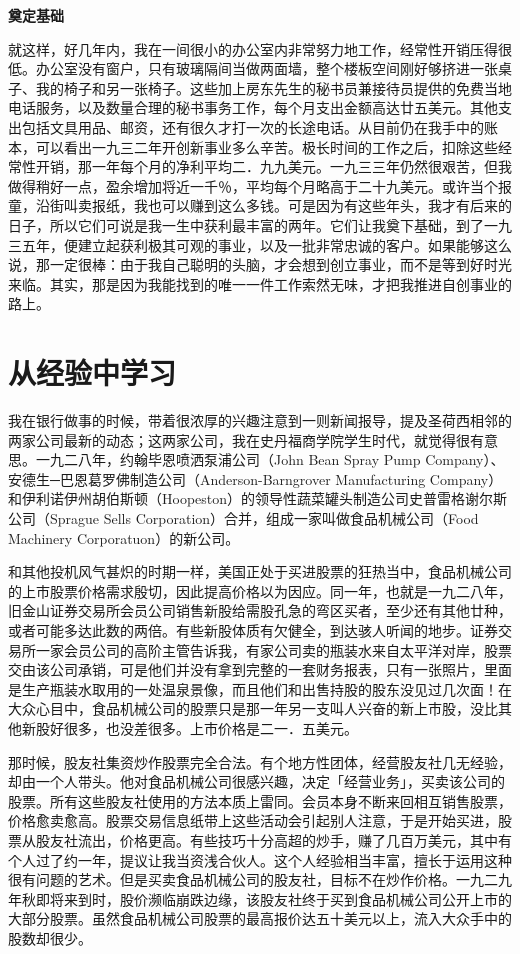 \documentclass[UTF8,a4paper,zihao=-4,fontset = windows]{ctexart} %
\begin{document}
\textbf{奠定基础}


就这样，好几年内，我在一间很小的办公室内非常努力地工作，经常性开销压得很低。办公室没有窗户，只有玻璃隔间当做两面墙，整个楼板空间刚好够挤进一张桌子、我的椅子和另一张椅子。这些加上房东先生的秘书员兼接待员提供的免费当地电话服务，以及数量合理的秘书事务工作，每个月支出金额高达廿五美元。其他支出包括文具用品、邮资，还有很久才打一次的长途电话。从目前仍在我手中的账本，可以看出一九三二年开创新事业多么辛苦。极长时间的工作之后，扣除这些经常性开销，那一年每个月的净利平均二．九九美元。一九三三年仍然很艰苦，但我做得稍好一点，盈余增加将近一千％，平均每个月略高于二十九美元。或许当个报童，沿街叫卖报纸，我也可以赚到这么多钱。可是因为有这些年头，我才有后来的日子，所以它们可说是我一生中获利最丰富的两年。它们让我奠下基础，到了一九三五年，便建立起获利极其可观的事业，以及一批非常忠诚的客户。如果能够这么说，那一定很棒：由于我自己聪明的头脑，才会想到创立事业，而不是等到好时光来临。其实，那是因为我能找到的唯一一件工作索然无味，才把我推进自创事业的路上。

\section{从经验中学习}

我在银行做事的时候，带着很浓厚的兴趣注意到一则新闻报导，提及圣荷西相邻的两家公司最新的动态；这两家公司，我在史丹福商学院学生时代，就觉得很有意思。一九二八年，约翰毕恩喷洒泵浦公司（John Bean Spray Pump Company）、安德生─巴恩葛罗佛制造公司（Anderson-Barngrover Manufacturing Company）和伊利诺伊州胡伯斯顿（Hoopeston）的领导性蔬菜罐头制造公司史普雷格谢尔斯公司（Sprague Sells Corporation）合并，组成一家叫做食品机械公司（Food Machinery Corporatuon）的新公司。

和其他投机风气甚炽的时期一样，美国正处于买进股票的狂热当中，食品机械公司的上市股票价格需求殷切，因此提高价格以为因应。同一年，也就是一九二八年，旧金山证券交易所会员公司销售新股给需股孔急的弯区买者，至少还有其他廿种，或者可能多达此数的两倍。有些新股体质有欠健全，到达骇人听闻的地步。证券交易所一家会员公司的高阶主管告诉我，有家公司卖的瓶装水来自太平洋对岸，股票交由该公司承销，可是他们并没有拿到完整的一套财务报表，只有一张照片，里面是生产瓶装水取用的一处温泉景像，而且他们和出售持股的股东没见过几次面！在大众心目中，食品机械公司的股票只是那一年另一支叫人兴奋的新上市股，没比其他新股好很多，也没差很多。上市价格是二一．五美元。

那时候，股友社集资炒作股票完全合法。有个地方性团体，经营股友社几无经验，却由一个人带头。他对食品机械公司很感兴趣，决定「经营业务」，买卖该公司的股票。所有这些股友社使用的方法本质上雷同。会员本身不断来回相互销售股票，价格愈卖愈高。股票交易信息纸带上这些活动会引起别人注意，于是开始买进，股票从股友社流出，价格更高。有些技巧十分高超的炒手，赚了几百万美元，其中有个人过了约一年，提议让我当资浅合伙人。这个人经验相当丰富，擅长于运用这种很有问题的艺术。但是买卖食品机械公司的股友社，目标不在炒作价格。一九二九年秋即将来到时，股价濒临崩跌边缘，该股友社终于买到食品机械公司公开上市的大部分股票。虽然食品机械公司股票的最高报价达五十美元以上，流入大众手中的股数却很少。
\end{document}
